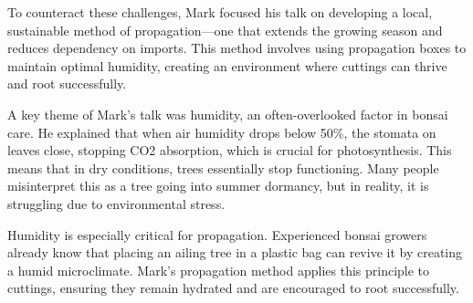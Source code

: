 To counteract these challenges, Mark focused his talk on developing a local, sustainable method of propagation---one that extends the growing season and reduces dependency on imports.
This method involves using propagation boxes to maintain optimal humidity, creating an environment where cuttings can thrive and root successfully.

\medskip

\noindent
A key theme of Mark's talk was humidity, an often\--overlooked factor in bonsai care.
He explained that when air humidity drops below 50\%, the stomata on leaves close, stopping CO2 absorption, which is crucial for photosynthesis.
This means that in dry conditions, trees essentially stop functioning.
Many people misinterpret this as a tree going into summer dormancy, but in reality, it is struggling due to environmental stress.

Humidity is especially critical for propagation.
Experienced bonsai growers already know that placing an ailing tree in a plastic bag can revive it by creating a humid microclimate.
Mark's propagation method applies this principle to cuttings, ensuring they remain hydrated and are encouraged to root successfully.

\medskip

